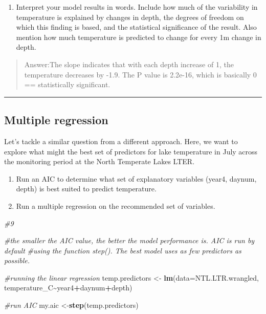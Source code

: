 \documentclass[
]{article}
\newenvironment{Shaded}{\begin{snugshade}}{\end{snugshade}}
\newcommand{\AttributeTok}[1]{\textcolor[rgb]{0.13,0.29,0.53}{#1}}
\newcommand{\CommentTok}[1]{\textcolor[rgb]{0.56,0.35,0.01}{\textit{#1}}}
\newcommand{\FunctionTok}[1]{\textcolor[rgb]{0.13,0.29,0.53}{\textbf{#1}}}
\newcommand{\NormalTok}[1]{#1}
\newcommand{\OtherTok}[1]{\textcolor[rgb]{0.56,0.35,0.01}{#1}}
\newcommand{\SpecialCharTok}[1]{\textcolor[rgb]{0.81,0.36,0.00}{\textbf{#1}}}
\providecommand{\tightlist}{%
  \setlength{\itemsep}{0pt}\setlength{\parskip}{0pt}}
\begin{document}
\begin{enumerate}
\def\labelenumi{\arabic{enumi}.}
\setcounter{enumi}{7}
\tightlist
\item
  Interpret your model results in words. Include how much of the
  variability in temperature is explained by changes in depth, the
  degrees of freedom on which this finding is based, and the statistical
  significance of the result. Also mention how much temperature is
  predicted to change for every 1m change in depth.
\end{enumerate}

\begin{quote}
Answer:The slope indicates that with each depth increase of 1, the
temperature decreases by -1.9. The P value is 2.2e-16, which is
basically 0 == statistically significant.
\end{quote}

\begin{center}\rule{0.5\linewidth}{0.5pt}\end{center}

\subsection{Multiple regression}\label{multiple-regression}

Let's tackle a similar question from a different approach. Here, we want
to explore what might the best set of predictors for lake temperature in
July across the monitoring period at the North Temperate Lakes LTER.

\begin{enumerate}
\def\labelenumi{\arabic{enumi}.}
\setcounter{enumi}{8}
\item
  Run an AIC to determine what set of explanatory variables (year4,
  daynum, depth) is best suited to predict temperature.
\item
  Run a multiple regression on the recommended set of variables.
\end{enumerate}

\begin{Shaded}
\begin{Highlighting}[]
\CommentTok{\#9}

\CommentTok{\#the smaller the AIC value, the better the model performance is. AIC is run by default }
\CommentTok{\#using the function step(). The best model uses as few predictors as possible. }

\CommentTok{\#running the linear regression}
\NormalTok{temp.predictors }\OtherTok{\textless{}{-}} \FunctionTok{lm}\NormalTok{(}\AttributeTok{data=}\NormalTok{NTL.LTR.wrangled, temperature\_C}\SpecialCharTok{\textasciitilde{}}\NormalTok{year4}\SpecialCharTok{+}\NormalTok{daynum}\SpecialCharTok{+}\NormalTok{depth)}

\CommentTok{\#run AIC }
\NormalTok{my.aic }\OtherTok{\textless{}{-}}\FunctionTok{step}\NormalTok{(temp.predictors)}
\end{Highlighting}
\end{Shaded}
\end{document}
